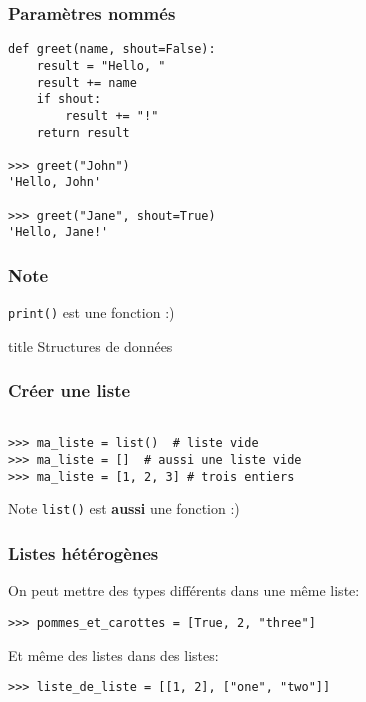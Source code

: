 \documentclass{beamer}
\begin{document}
\begin{frame}[fragile]
  \frametitle{Paramètres nommés}
\begin{lstlisting}
def greet(name, shout=False):
    result = "Hello, "
    result += name
    if shout:
        result += "!"
    return result

>>> greet("John")
'Hello, John'

>>> greet("Jane", shout=True)
'Hello, Jane!'
\end{lstlisting}


\end{frame}

\begin{frame}[fragile]
  \frametitle{Note}
\texttt{print()} est une fonction :)
\end{frame}


\begin{frame}[fragile]
  \begin{beamercolorbox}[sep=8pt,center,shadow=true,rounded=true]{title}
    Structures de données
  \end{beamercolorbox}
\end{frame}

\begin{frame}[fragile]
  \frametitle{Créer une liste}
\begin{lstlisting}

>>> ma_liste = list()  # liste vide
>>> ma_liste = []  # aussi une liste vide
>>> ma_liste = [1, 2, 3] # trois entiers

\end{lstlisting}

\vfill

\begin{alertblock}{Note}
  \texttt{list()} est \textbf{aussi} une fonction :)
\end{alertblock}

\end{frame}

\begin{frame}[fragile]
  \frametitle{Listes hétérogènes}

On peut mettre des types différents dans une même liste:

\begin{lstlisting}
>>> pommes_et_carottes = [True, 2, "three"]
\end{lstlisting}

\vfill
Et même des listes dans des listes:

\begin{lstlisting}
>>> liste_de_liste = [[1, 2], ["one", "two"]]
\end{lstlisting}


\end{frame}
\end{document}

